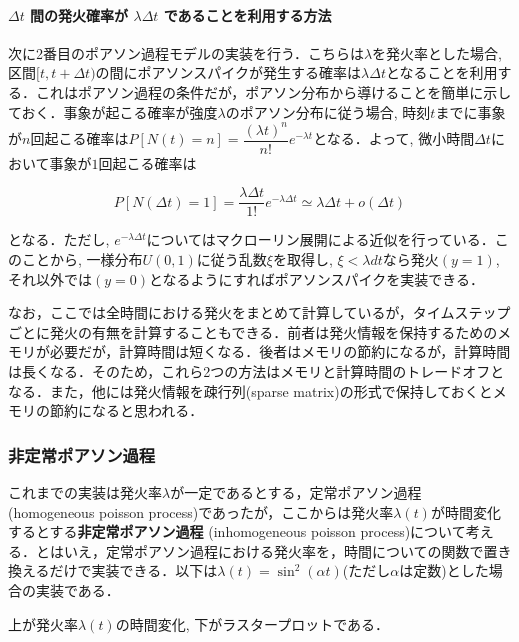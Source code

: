 \paragraph{$\Delta t$ 間の発火確率が $\lambda\Delta t$ であることを利用する方法}
次に2番目のポアソン過程モデルの実装を行う．こちらは$\lambda$を発火率とした場合, 区間$[t, t+\Delta t)$の間にポアソンスパイクが発生する確率は$\lambda \Delta t$となることを利用する．これはポアソン過程の条件だが，ポアソン分布から導けることを簡単に示しておく．事象が起こる確率が強度$\lambda$のポアソン分布に従う場合, 時刻$t$までに事象が$n$回起こる確率は$P[N(t)=n]=\dfrac{(\lambda t)^{n}}{n !} e^{-\lambda t}$となる．よって, 微小時間$\Delta t$において事象が$1$回起こる確率は


\begin{equation}
P[N(\Delta t)=1]=\dfrac{\lambda \Delta t}{1 !} e^{-\lambda \Delta t}\simeq \lambda \Delta t+o(\Delta t)
\end{equation}


となる．ただし, $e^{-\lambda \Delta t}$についてはマクローリン展開による近似を行っている．このことから, 一様分布$U(0,1)$に従う乱数$\xi$を取得し, $\xi<\lambda dt$なら発火$(y=1)$, それ以外では$(y=0)$となるようにすればポアソンスパイクを実装できる．




なお，ここでは全時間における発火をまとめて計算しているが，タイムステップごとに発火の有無を計算することもできる．前者は発火情報を保持するためのメモリが必要だが，計算時間は短くなる．後者はメモリの節約になるが，計算時間は長くなる．そのため，これら2つの方法はメモリと計算時間のトレードオフとなる．また，他には発火情報を疎行列(sparse matrix)の形式で保持しておくとメモリの節約になると思われる．
\subsubsection{非定常ポアソン過程}
これまでの実装は発火率$\lambda$が一定であるとする，定常ポアソン過程 (homogeneous poisson process)であったが，ここからは発火率$\lambda(t)$が時間変化するとする\textbf{非定常ポアソン過程} (inhomogeneous poisson process)について考える．とはいえ，定常ポアソン過程における発火率を，時間についての関数で置き換えるだけで実装できる．以下は$\lambda(t)=\sin^2(\alpha t)$(ただし$\alpha$は定数)とした場合の実装である．


上が発火率$\lambda(t)$の時間変化, 下がラスタープロットである．
